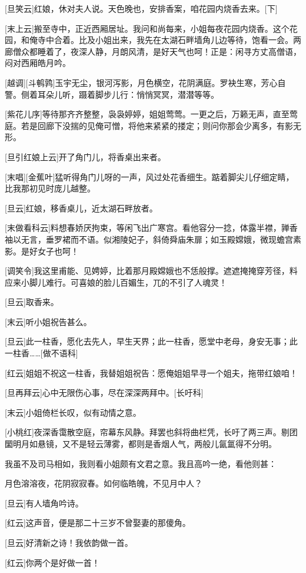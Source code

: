 \documentclass{book}
\begin{document}
[旦笑云]红娘，休对夫人说。天色晚也，安排香案，咱花园内烧香去来。[下]

[末上云]搬至寺中，正近西厢居址。我问和尚每来，小姐每夜花园内烧香。这个花园，和俺寺中合着。比及小姐出来，我先在太湖石畔墙角儿边等待，饱看一会。两廊僧众都睡着了，夜深人静，月朗风清，是好天气也呵！正是：闲寻方丈高僧语，闷对西厢皓月吟。

[越调][斗鹌鹑]玉宇无尘，银河泻影，月色横空，花阴满庭。罗袂生寒，芳心自警。侧着耳朵儿听，蹑着脚步儿行：悄悄冥冥，潜潜等等。

[紫花儿序]等待那齐齐整整，袅袅婷婷，姐姐莺莺。一更之后，万籁无声，直至莺庭。若是回廊下没揣的见俺可憎，将他来紧紧的搂定；则问你那会少离多，有影无形。

[旦引红娘上云]开了角门儿，将香桌出来者。

[末唱][金蕉叶]猛听得角门儿呀的一声，风过处花香细生。踮着脚尖儿仔细定睛，比我那初见时庞儿越整。

[旦云]红娘，移香桌儿，近太湖石畔放者。

[末做看科云]料想春娇厌拘束，等闲飞出广寒宫。看他容分一捻，体露半襟，亸香袖以无言，垂罗裙而不语。似湘陵妃子，斜倚舜庙朱扉；如玉殿嫦娥，微现蟾宫素影。是好女子也呵！

[调笑令]我这里甫能、见娉婷，比着那月殿嫦娥也不恁般撑。遮遮掩掩穿芳径，料应来小脚儿难行。可喜娘的脸儿百媚生，兀的不引了人魂灵！

[旦云]取香来。

[末云]听小姐祝告甚么。

[旦云]此一柱香，愿化去先人，早生天界；此一柱香，愿堂中老母，身安无事；此一柱香……[做不语科]

[红云]姐姐不祝这一柱香，我替姐姐祝告：愿俺姐姐早寻一个姐夫，拖带红娘咱！

[旦再拜云]心中无限伤心事，尽在深深两拜中。[长吁科]

[末云]小姐倚栏长叹，似有动情之意。

[小桃红]夜深香霭散空庭，帘幕东风静。拜罢也斜将曲栏凭，长吁了两三声。剔团圞明月如悬镜，又不是轻云薄雾，都则是香烟人气，两般儿氤氲得不分明。

我虽不及司马相如，我则看小姐颇有文君之意。我且高吟一绝，看他则甚：

月色溶溶夜，花阴寂寂春。如何临皓魄，不见月中人？

[旦云]有人墙角吟诗。

[红云]这声音，便是那二十三岁不曾娶妻的那傻角。

[旦云]好清新之诗！我依韵做一首。

[红云]你两个是好做一首！
\end{document}
